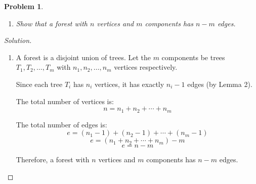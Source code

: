 \documentclass[12pt]{article}
\newtheorem{problem}{Problem}
\begin{document}
\setcounter{problem}{10}
\begin{problem}
\begin{enumerate}[label=(\alph*)]
    \item Show that a forest with $n$ vertices and $m$ components has $n - m$ edges.
\end{enumerate}
\end{problem}

\begin{proof}[Solution]
~
\begin{enumerate}[label=(\alph*)]
    \item A forest is a disjoint union of trees. Let the $m$ components be trees $T_1, T_2, \ldots, T_m$ with $n_1, n_2, \ldots, n_m$ vertices respectively.
    
    Since each tree $T_i$ has $n_i$ vertices, it has exactly $n_i - 1$ edges (by Lemma 2).
    
    The total number of vertices is:
    $$n = n_1 + n_2 + \cdots + n_m$$
    
    The total number of edges is:
    $$e = (n_1 - 1) + (n_2 - 1) + \cdots + (n_m - 1)$$
    $$e = (n_1 + n_2 + \cdots + n_m) - m$$
    $$e = n - m$$
    
    Therefore, a forest with $n$ vertices and $m$ components has $n - m$ edges.
\end{enumerate}
\end{proof}
\end{document}
